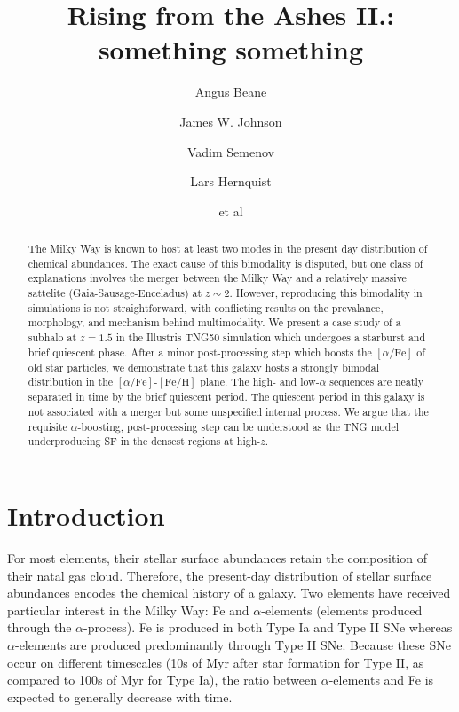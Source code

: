 \documentclass[linenumbers, twocolumn]{aastex631}
\newcommand{\FeH}{\ensuremath{[\textrm{Fe}/\textrm{H}]}}
\newcommand{\alphaFe}{\ensuremath{[\alpha/\textrm{Fe}]}}
\begin{document}
\title{Rising from the Ashes II.: something something}

\author{Angus Beane}

\author{James W. Johnson}

\author{Vadim Semenov}

\author{Lars Hernquist}

\author{et al}

\begin{abstract}
    The Milky Way is known to host at least two modes in the present day distribution of chemical abundances. The exact cause of this bimodality is disputed, but one class of explanations involves the merger between the Milky Way and a relatively massive sattelite (Gaia-Sausage-Enceladus) at $z\sim2$. However, reproducing this bimodality in simulations is not straightforward, with conflicting results on the prevalance, morphology, and mechanism behind multimodality. We present a case study of a subhalo at $z=1.5$ in the Illustris TNG50 simulation which undergoes a starburst and brief quiescent phase. After a minor post-processing step which boosts the \alphaFe{} of old star particles, we demonstrate that this galaxy hosts a strongly bimodal distribution in the \alphaFe{}-\FeH{} plane. The high- and low-$\alpha$ sequences are neatly separated in time by the brief quiescent period. The quiescent period in this galaxy is not associated with a merger but some unspecified internal process. We argue that the requisite $\alpha$-boosting, post-processing step can be understood as the TNG model underproducing SF in the densest regions at high-$z$.
  \end{abstract}
    
  

\section{Introduction}\label{sec:intro}
For most elements, their stellar surface abundances retain the composition of their natal gas cloud. Therefore, the present-day distribution of stellar surface abundances encodes the chemical history of a galaxy. Two elements have received particular interest in the Milky Way: Fe and $\alpha$-elements (elements produced through the $\alpha$-process). Fe is produced in both Type Ia and Type II SNe whereas $\alpha$-elements are produced predominantly through Type II SNe. Because these SNe occur on different timescales (10s of Myr after star formation for Type II, as compared to 100s of Myr for Type Ia), the ratio between $\alpha$-elements and Fe is expected to generally decrease with time.
\end{document}
